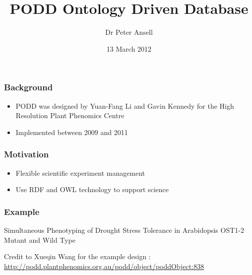 \documentclass[12pt]{beamer}
\title{PODD Ontology Driven Database}
\author{Dr Peter Ansell}
\institute{University of Queensland}
\date{13 March 2012}
\begin{document}
\begin{frame}
\titlepage
\end{frame}


\begin{frame}
\frametitle{Background} 

\begin{itemize}
 \item PODD was designed by Yuan-Fang Li and Gavin Kennedy for the High Resolution Plant Phenomics Centre
 \item Implemented between 2009 and 2011
\end{itemize}

\end{frame}

\begin{frame}
\frametitle{Motivation} 

\begin{itemize}
 \item Flexible scientific experiment management
 \item Use RDF and OWL technology to support science
\end{itemize}


\end{frame}

\begin{frame}
\frametitle{Example} 

Simultaneous Phenotyping of Drought Stress Tolerance in Arabidopsis OST1-2 Mutant and Wild Type 

\vskip 12pt


Credit to Xueqin Wang for the example design : \url{http://podd.plantphenomics.org.au/podd/object/poddObject:838}

\end{frame}

\bgroup
{}
\begin{frame}[plain]{}
\end{frame}
\egroup
\end{document}
